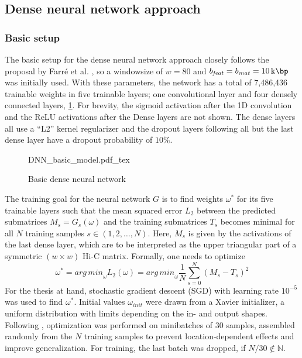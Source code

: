 \subsection{Dense neural network approach}

\subsubsection{Basic setup} \label{sec:methods:basicSetup}
The basic setup for the dense neural network approach closely follows the proposal by Farr\'e et al. \cite{Farre2018a},
so a windowsize of $w=80$ and $b_\mathit{feat}=b_\mathit{mat} = \SI{10}{\kilo\bp}$ was initially used.
With these parameters, the network has a total of 7,486,436 trainable weights in five trainable layers; 
one convolutional layer and four densely connected layers, \cref{fig:methods:basic_dnn}.
For brevity, the sigmoid activation after the 1D convolution and the ReLU activations after the Dense layers are not shown.
The dense layers all use a ``L2'' kernel regularizer and the dropout layers following all but the last dense layer have a dropout probability of $10\%$.
\begin{figure}[htb]
    \small
    \centering
    {DNN_basic_model.pdf_tex}
    \caption{Basic dense neural network}
    \label{fig:methods:basic_dnn}
\end{figure}

The training goal for the neural network $G$ is to find weights $\omega^*$ for its five trainable layers 
such that the mean squared error $L_2$ between the predicted submatrices $M_s = G_s(\omega)$ 
and the training submatrices $T_s$ becomes minimal for all $N$ training samples $s \in (1,2,\dots, N)$. 
Here, $M_s$ is given by the activations of the last dense layer, which are to be interpreted as the upper triangular 
part of a symmetric $(w\times w)$ Hi-C matrix.
Formally, one needs to optimize
\begin{equation}
 \omega^* = \mathit{arg\,min}_\omega L_2(\omega) = \mathit{arg\,min}_\omega \frac{1}{N} \sum_{s=0}^N (M_s - T_s)^2 \label{eq:methods:nn-mse}
\end{equation} 
For the thesis at hand, stochastic gradient descent (SGD) with learning rate $10^{-5}$  was used to find $\omega^*$.
Initial values $\omega_\mathit{init}$ were drawn from a Xavier initializer, a uniform distribution with limits depending on the in- and output shapes.
Following \cite{Farre2018a}, optimization was performed on minibatches of 30 samples, assembled randomly from the $N$ training samples
to prevent location-dependent effects and improve generalization.
For training, the last batch was dropped, if $N/30 \not \in \mathbb{N}$. 

